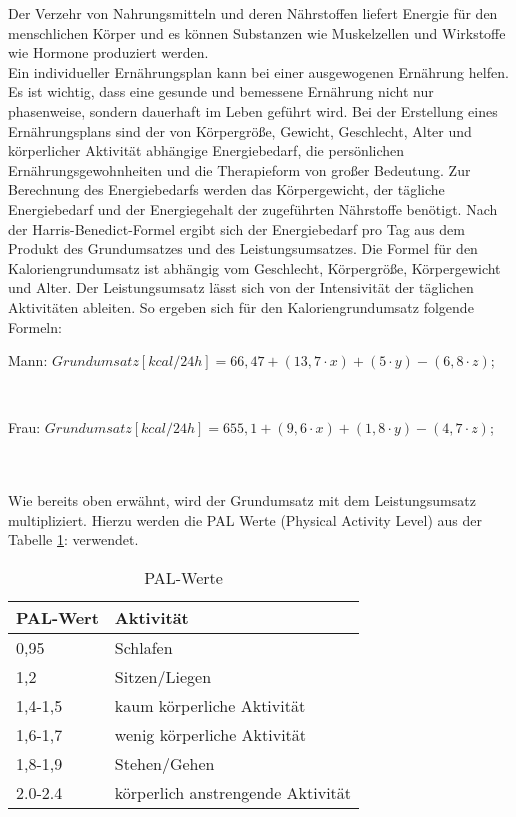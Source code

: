 		Der Verzehr von Nahrungsmitteln und deren Nährstoffen liefert Energie für den menschlichen Körper und es können Substanzen wie Muskelzellen und Wirkstoffe wie Hormone produziert werden. \cite{ND}\\
		Ein individueller Ernährungsplan kann bei einer ausgewogenen Ernährung helfen. Es ist wichtig, dass eine gesunde und bemessene Ernährung nicht nur phasenweise, sondern dauerhaft im Leben geführt wird. Bei der Erstellung eines Ernährungsplans sind der von Körpergröße, Gewicht, Geschlecht, Alter und körperlicher Aktivität abhängige Energiebedarf, die persönlichen Ernährungsgewohnheiten und die Therapieform von großer Bedeutung. Zur Berechnung des Energiebedarfs werden das Körpergewicht, der tägliche Energiebedarf und der Energiegehalt der zugeführten Nährstoffe benötigt.\cite{SG} \newline
		Nach der Harris-Benedict-Formel ergibt sich der Energiebedarf pro Tag aus dem Produkt des Grundumsatzes und des Leistungsumsatzes. Die Formel für den Kaloriengrundumsatz ist abhängig vom Geschlecht, Körpergröße, Körpergewicht und Alter. Der Leistungsumsatz lässt sich von der Intensivität der täglichen Aktivitäten ableiten. So ergeben sich für den Kaloriengrundumsatz folgende Formeln: \newline
		\\
		\centerline{Mann: $Grundumsatz [kcal/ 24h] {=} 66,47 + (13,7 \cdot x) + (5 \cdot y) - (6,8 \cdot z)$;}\\
		\centerline{Frau: $Grundumsatz [kcal/ 24h] {=} 655,1 + (9,6 \cdot x) + (1,8 \cdot y) - (4,7 \cdot z)$;}\\
		\noindent\hspace*{16mm}{x = Körpergewicht [kg];}\newline
		\noindent\hspace*{16mm}{y = Körpergröße [cm];}\newline
		\noindent{}\newline
		\\
	Wie bereits oben erwähnt, wird der Grundumsatz mit dem Leistungsumsatz multipliziert. Hierzu werden die PAL Werte (Physical Activity Level) aus der Tabelle \ref{tab:PAL-Werte}:  verwendet.\cite{SG}
	\begin{table}[H]
		\setlength{\tabcolsep}{12pt}
		\centering
		\begin{tabular}{ll}
			\toprule
			\textbf{PAL-Wert} & \textbf{Aktivität}\\
			\midrule
			0,95 & Schlafen\\
			1,2 & Sitzen/Liegen\\
			1,4-1,5 & kaum körperliche Aktivität\\
			1,6-1,7 & wenig körperliche Aktivität\\
			1,8-1,9 & Stehen/Gehen\\
			2.0-2.4 & körperlich anstrengende Aktivität\\
			\bottomrule
		\end{tabular}
		\captionsetup{justification=centering}
		\caption{PAL-Werte}
		\label{tab:PAL-Werte}
	\end{table}
